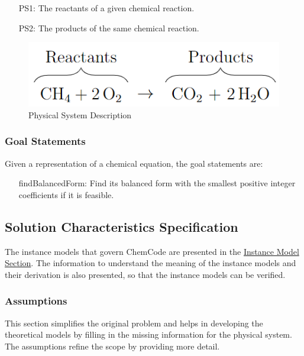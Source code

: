 \documentclass[12pt]{article}
\begin{document}
\begin{itemize}
\item[PS1:]{The reactants of a given chemical reaction.}
\item[PS2:]{The products of the same chemical reaction.}
\end{itemize}
\begin{figure}
\begin{center}
\includegraphics[width=\textwidth]{../../../../datafiles/chemcode/physSysFig.png}
\caption{Physical System Description}
\label{Figure:physSysFig}
\end{center}
\end{figure}
\subsubsection{Goal Statements}
\label{Sec:GoalStmt}
Given a representation of a chemical equation, the goal statements are:

\begin{itemize}
\item[findBalancedForm:\phantomsection\label{findBalancedForm}]{Find its balanced form with the smallest positive integer coefficients if it is feasible.}
\end{itemize}
\subsection{Solution Characteristics Specification}
\label{Sec:SolCharSpec}
The instance models that govern ChemCode are presented in the \hyperref[Sec:IMs]{Instance Model Section}. The information to understand the meaning of the instance models and their derivation is also presented, so that the instance models can be verified.

\subsubsection{Assumptions}
\label{Sec:Assumps}
This section simplifies the original problem and helps in developing the theoretical models by filling in the missing information for the physical system. The assumptions refine the scope by providing more detail.
\end{document}
